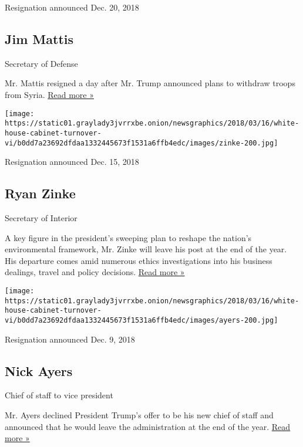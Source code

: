 Resignation announced Dec. 20, 2018

\hypertarget{jim-mattis}{%
\subsection{Jim Mattis}\label{jim-mattis}}

Secretary of Defense

Mr. Mattis resigned a day after Mr. Trump announced plans to withdraw
troops from Syria.
\href{https://www.nytimes3xbfgragh.onion/2018/12/20/us/politics/jim-mattis-defense-secretary-trump.html?emc=edit_na_20181220\&nl=breaking-news\&nlid=67884862ing-news\&ref=cta}{Read
more »}

\texttt{[image: https://static01.graylady3jvrrxbe.onion/newsgraphics/2018/03/16/white-house-cabinet-turnover-vi/b0dd7a23692dfdaa1332445673f1531a6ffb4edc/images/zinke-200.jpg]}

Resignation announced Dec. 15, 2018

\hypertarget{ryan-zinke}{%
\subsection{Ryan Zinke}\label{ryan-zinke}}

Secretary of Interior

A key figure in the president's sweeping plan to reshape the nation's
environmental framework, Mr. Zinke will leave his post at the end of the
year. His departure comes amid numerous ethics investigations into his
business dealings, travel and policy decisions.
\href{https://www.nytimes3xbfgragh.onion/2018/12/15/us/ryan-zinke-interior-secretary.html}{Read
more »}

\texttt{[image: https://static01.graylady3jvrrxbe.onion/newsgraphics/2018/03/16/white-house-cabinet-turnover-vi/b0dd7a23692dfdaa1332445673f1531a6ffb4edc/images/ayers-200.jpg]}

Resignation announced Dec. 9, 2018

\hypertarget{nick-ayers}{%
\subsection{Nick Ayers}\label{nick-ayers}}

Chief of staff to vice president

Mr. Ayers declined President Trump's offer to be his new chief of staff
and announced that he would leave the administration at the end of the
year.
\href{https://www.nytimes3xbfgragh.onion/2018/12/09/us/politics/nick-ayers-trump-chief-of-staff.html}{Read
more »}

